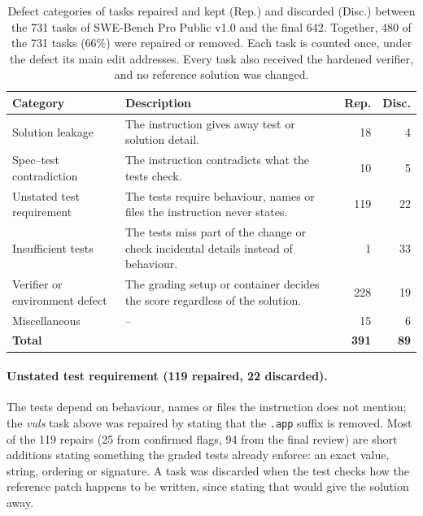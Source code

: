 \begin{table}[t]
\centering
\small
\setlength{\tabcolsep}{3pt}
\begin{tabularx}{\columnwidth}{@{}>{\raggedright\arraybackslash}p{2.05cm} >{\raggedright\arraybackslash}X r r@{}}
\toprule
\textbf{Category} & \textbf{Description} & \textbf{Rep.} & \textbf{Disc.} \\
\midrule
Solution leakage & The instruction gives away test or solution detail. & 18 & 4 \\
\addlinespace
Spec--test contradiction & The instruction contradicts what the tests check. & 10 & 5 \\
\addlinespace
Unstated test requirement & The tests require behaviour, names or files the instruction never states. & 119 & 22 \\
\addlinespace
Insufficient tests & The tests miss part of the change or check incidental details instead of behaviour. & 1 & 33 \\
\addlinespace
Verifier or environment defect & The grading setup or container decides the score regardless of the solution. & 228 & 19 \\
\addlinespace
Miscellaneous & -- & 15 & 6 \\
\midrule
\textbf{Total} & & \textbf{391} & \textbf{89} \\
\bottomrule
\end{tabularx}
\caption{Defect categories of tasks repaired and kept (Rep.) and discarded (Disc.) between the 731 tasks of SWE-Bench Pro Public v1.0 and the final 642. Together, 480 of the 731 tasks (66\%) were repaired or removed. Each task is counted once, under the defect its main edit addresses. Every task also received the hardened verifier, and no reference solution was changed.}
\label{tab:repairs-discards}
\end{table}

\paragraph{Unstated test requirement (119 repaired, 22 discarded).}
The tests depend on behaviour, names or files the instruction does not mention; the \textit{vuls} task above was repaired by stating that the \texttt{.app} suffix is removed. Most of the 119 repairs (25 from confirmed flags, 94 from the final review) are short additions stating something the graded tests already enforce: an exact value, string, ordering or signature. A task was discarded when the test checks how the reference patch happens to be written, since stating that would give the solution away.

